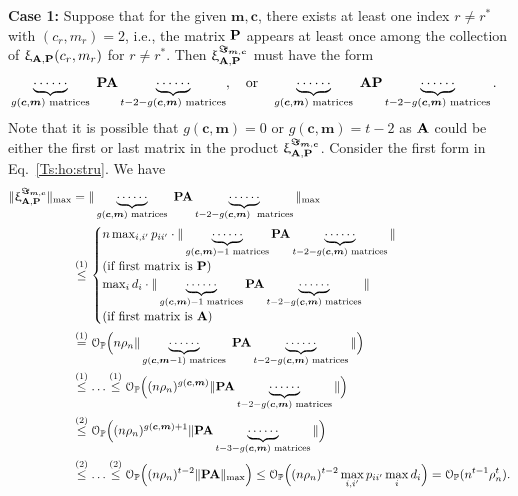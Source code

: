 \documentclass[10pt,journal,compsoc]{IEEEtran}
\newcommand{\op}{\mathcal{O}_{\mathbb{P}}}
\newcommand{\bds}{\boldsymbol}
\newcommand{\M}[1]{{{\mathbf{\MakeUppercase{#1}}}}}
\numberwithin{equation}{section}
\begin{document}
\noindent\textbf{Case 1:} Suppose that for the given $\bds{m},\bds{c}$,
there exists at least one index $r \not = r^{*}$ with $(c_r, m_r) =
2$, i.e., the matrix $\M P$ appears at least once among the collection
of 
$\upxi_{\M A, \M P}(c_r, m_r)$ for $r \not = r^{*}$. Then $\upxi_{\M A,\M P}^{\bds{\Im}_{\bds{m},\bds{c}}}$ must have the form
\begin{equation}\label{Ts:ho:stru}
\begin{aligned}
&\underbrace{\cdots\cdots}_{g(\bds{c},\bds{m}) \,\, \text{matrices}} \ \M
P \M A\underbrace{\cdots\cdots}_{t - 2 - g(\bds{c},\bds{m})
  \,\, \text{matrices}}, \quad \text{or} \quad
\underbrace{\cdots\cdots}_{g(\bds{c},\bds{m}) \,\, \text{matrices}}\ \M A \M P
\underbrace{\cdots\cdots}_{t - 2 - g(\bds{c},\bds{m}) \,\,\text{matrices}}.
\end{aligned}
\end{equation}
Note that it is possible that $g(\bds{c},\bds{m}) = 0$ or $g(\bds{c},\bds{m}) = t - 2$ as $\M A$
could be either the first or last matrix in the product
$\upxi_{\M A,\M P}^{\bds{\Im}_{\bds{m},\bds{c}}}$.
Consider the first form in Eq.~\eqref{Ts:ho:stru}. We have
\begin{equation}
  \begin{split}
\|\upxi_{\M A,\M P}^{\bds{\Im}_{\bds{m},\bds{c}}}\|_{\max} 
&=
\|\underbrace{\cdots\cdots}_{g(\bds{c},\bds{m}) \,\, \text{matrices}} \ \M P
\M A\underbrace{\cdots\cdots}_{t - 2 - g(\bds{c},\bds{m}) \,\, \text{ matrices}}\|_{\max}
\\
& \overset{(1)}{\leq}
\begin{cases}
n\max_{i,i'} p_{ii'}
\cdot\|\underbrace{\cdots\cdots}_{g(\bds{c},\bds{m}) - 1 \,\, \text{matrices}}
\M P \M A\underbrace{\cdots\cdots}_{t - 2 - g(\bds{c},\bds{m}) \,\,
  \text{matrices}}\| 
  \\(\text{if first matrix is }\M P)
\\
\max_i d_i \cdot\|\underbrace{\cdots\cdots}_{g(\bds{c},\bds{m}) - 1
  \,\, \text{matrices}} \M P \M A\underbrace{\cdots\cdots}_{t - 2 -
  g(\bds{c},\bds{m}) \,\, \text{matrices}}\| 
  \\(\text{if first matrix is }\M A)
\end{cases}
\\
&\overset{(1)}{=}
\op\Big(n\rho_n\|\underbrace{\cdots\cdots}_{g(\bds{c},\bds{m} - 1) \,\,
  \text{matrices}} \ \M P \M A\underbrace{\cdots\cdots}_{t - 2 -
  g(\bds{c},\bds{m}) \,\, \text{matrices}}\|\Big)
  \\
  &\overset{(1)}{\leq}\dots
\overset{(1)}{\leq}\op\Big((n\rho_n)^{g(\bds{c},\bds{m})}\|\M
P\M A\underbrace{\cdots\cdots}_{t - 2 - g(\bds{c},\bds{m}) \,\, \text{matrices}}\|\Big)
\\
&\overset{(2)}{\leq}
\op\Big((n\rho_n)^{g(\bds{c},\bds{m})+1}\|\M P\M
A\underbrace{\cdots\cdots}_{t - 3 - g(\bds{c},\bds{m}) \,\,
  \text{matrices}}\|\Big)
  \\
  &\overset{(2)}{\leq}\dots
\overset{(2)}{\leq}\op\Big((n\rho_n)^{t-2}\|\M P \M A\|_{\max}\Big)
\leq\op\Big((n\rho_n)^{t-2}\max_{i,i'}p_{ii'} \max_i d_i \Big)
= \op(n^{t-1}\rho_n^{t}).
\end{split}
\end{equation}
\end{document}
